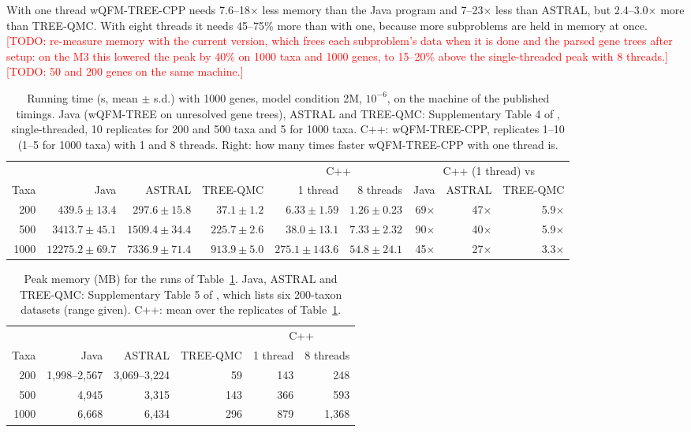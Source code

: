 \documentclass[11pt,a4paper]{article}
\newcommand{\todo}[1]{\textcolor{red}{[TODO: #1]}}
\newcommand{\wqfmtree}{wQFM-TREE}
\newcommand{\cpp}{wQFM-TREE-CPP}
\begin{document}
With one thread \cpp{} needs 7.6--18$\times$ less memory than the Java program and 7--23$\times$ less
than ASTRAL, but 2.4--3.0$\times$ more than TREE-QMC. With eight threads it needs 45--75\% more than with
one, because more subproblems are held in memory at once. \todo{re-measure memory with the current
version, which frees each subproblem's data when it is done and the parsed gene trees after setup: on
the M3 this lowered the peak by 40\% on 1000 taxa and 1000 genes, to 15--20\% above the
single-threaded peak with 8 threads.} \todo{50 and 200 genes on the same machine.}

\begin{table}[t]
\centering\small
\caption{Running time (s, mean $\pm$ s.d.) with 1000 genes, model condition 2M, $10^{-6}$, on the
machine of the published timings. Java (\wqfmtree{} on unresolved gene trees), ASTRAL and TREE-QMC:
Supplementary Table 4 of \citet{rafi2025wqfmtree}, single-threaded, 10 replicates for 200 and 500 taxa
and 5 for 1000 taxa. C++: \cpp, replicates 1--10 (1--5 for 1000 taxa) with 1 and 8 threads. Right:
how many times faster \cpp{} with one thread is.}
\label{tab:runtime}
\footnotesize\setlength{\tabcolsep}{3.5pt}
\begin{tabular}{rrrrrrrrr}
\toprule
 & & & & \multicolumn{2}{c}{C++} & \multicolumn{3}{c}{C++ (1 thread) vs} \\
\cmidrule(lr){5-6}\cmidrule(lr){7-9}
Taxa & Java & ASTRAL & TREE-QMC & 1 thread & 8 threads & Java & ASTRAL & TREE-QMC \\
\midrule
200  & $439.5\pm13.4$   & $297.6\pm15.8$  & $37.1\pm1.2$  & $6.33\pm1.59$   & $1.26\pm0.23$ & 69$\times$ & 47$\times$ & 5.9$\times$ \\
500  & $3413.7\pm45.1$  & $1509.4\pm34.4$ & $225.7\pm2.6$ & $38.0\pm13.1$   & $7.33\pm2.32$ & 90$\times$ & 40$\times$ & 5.9$\times$ \\
1000 & $12275.2\pm69.7$ & $7336.9\pm71.4$ & $913.9\pm5.0$ & $275.1\pm143.6$ & $54.8\pm24.1$ & 45$\times$ & 27$\times$ & 3.3$\times$ \\
\bottomrule
\end{tabular}
\end{table}

\begin{table}[t]
\centering\small
\caption{Peak memory (MB) for the runs of Table~\ref{tab:runtime}. Java, ASTRAL and TREE-QMC:
Supplementary Table 5 of \citet{rafi2025wqfmtree}, which lists six 200-taxon datasets (range given).
C++: mean over the replicates of Table~\ref{tab:runtime}.}
\label{tab:memory}
\begin{tabular}{rrrrrr}
\toprule
 & & & & \multicolumn{2}{c}{C++} \\
\cmidrule(lr){5-6}
Taxa & Java & ASTRAL & TREE-QMC & 1 thread & 8 threads \\
\midrule
200  & 1{,}998--2{,}567 & 3{,}069--3{,}224 & 59  & 143 & 248 \\
500  & 4{,}945          & 3{,}315          & 143 & 366 & 593 \\
1000 & 6{,}668          & 6{,}434          & 296 & 879 & 1{,}368 \\
\bottomrule
\end{tabular}
\end{table}
\end{document}

